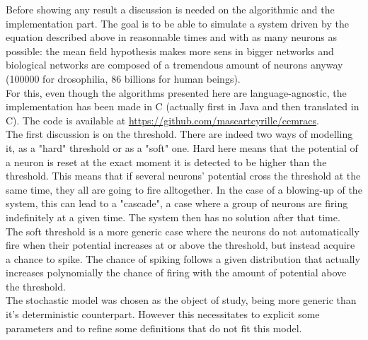 	Before showing any result a discussion is needed on the algorithmic and the implementation part. The goal is to be able to simulate a system driven by the equation described above in reasonnable times and with as many neurons as possible: the mean field hypothesis makes more sens in bigger networks and biological networks are composed of a tremendous amount of neurons anyway (100000 for drosophilia, 86 billions for human beings).\\
	For this, even though the algorithms presented here are language-agnostic, the implementation has been made in C (actually first in Java and then translated in C). The code is available at \url{https://github.com/mascartcyrille/cemracs}.\\

	The first discussion is on the threshold. There are indeed two ways of modelling it, as a "hard" threshold or as a "soft" one. Hard here means that the potential of a neuron is reset at the exact moment it is detected to be higher than the threshold. This means that if several neurons' potential cross the threshold at the same time, they all are going to fire alltogether. In the case of a blowing-up of the system, this can lead to a "cascade", a case where a group of neurons are firing indefinitely at a given time. The system then has no solution after that time.\\
	The soft threshold is a more generic case where the neurons do not automatically fire when their potential increases at or above the threshold, but instead acquire a chance to spike. The chance of spiking follows a given distribution that actually increases polynomially the chance of firing with the amount of potential above the threshold.\\
	The stochastic model was chosen as the object of study, being more generic than it's deterministic counterpart. However this necessitates to explicit some parameters and to refine some definitions that do not fit this model.\\

